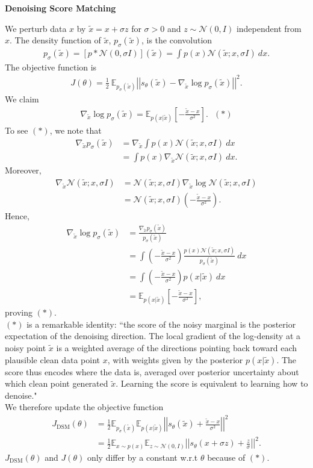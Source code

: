\documentclass[12pt,oneside]{article}
\newcommand{\norm}[1]{\left|\left|#1\right|\right|}
\newcommand{\CN}[0]{\mathcal{N}}
\newcommand{\BE}[0]{\mathbb{E}}
\newcommand{\ali}[1]{\begin{align*}#1\end{align*}}
\theoremstyle{plain}
\theoremstyle{remark}
\begin{document}
{\bf Denoising Score Matching\\}

We perturb data $x$ by $\tilde{x} = x + \sigma z$ for $\sigma > 0$ and $z \sim \CN(0, I)$ independent from $x$. The density function of $\tilde{x}$, $p_\sigma(\tilde{x})$, is the convolution
\ali{p_\sigma(\tilde{x}) = [p * \CN(0, \sigma I)](\tilde{x}) = \int p(x) \CN(\tilde{x}; x, \sigma I) \ dx.}
The objective function is 
\ali{J(\theta) = \frac{1}{2} \ \BE_{p_\sigma(\tilde{x})}  \norm{s_\theta(\tilde{x}) - \nabla_{\tilde{x}} \log p_\sigma(\tilde{x})}^2.}
We claim 
\ali{\nabla_{\tilde{x}} \log p_\sigma(\tilde{x}) = \BE_{p(x | \tilde{x})} \left[ - \frac{\tilde{x} - x}{\sigma^2} \right]. \ \ \ (*)}
To see $(*)$, we note that 
\ali{\nabla_{\tilde{x}} p_\sigma(\tilde{x}) &= \nabla_{\tilde{x}} \int p(x) \CN(\tilde{x}; x, \sigma I) \ dx \\
                                            &= \int p(x) \nabla_{\tilde{x}} \CN(\tilde{x}; x, \sigma I) \ dx.}
Moreover, 
\ali{\nabla_{\tilde{x}} \CN(\tilde{x}; x, \sigma I) &= \CN(\tilde{x}; x, \sigma I) \nabla_{\tilde{x}} \log \CN(\tilde{x}; x, \sigma I) \\
                                                    &= \CN(\tilde{x}; x, \sigma I) \left(- \frac{\tilde{x} - x}{\sigma^2} \right).}
Hence, 
\ali{\nabla_{\tilde{x}} \log p_\sigma(\tilde{x}) &=  \frac{\nabla_{\tilde{x}} p_\sigma(\tilde{x})}{ p_\sigma(\tilde{x})} \\
                                                 &= \int \left(- \frac{\tilde{x} - x}{\sigma^2} \right) \frac{p(x)\CN(\tilde{x}; x, \sigma I)}{p_\sigma(\tilde{x})} \ dx \\
                                                 &= \int \left(- \frac{\tilde{x} - x}{\sigma^2} \right) p(x | \tilde{x}) \ dx \\
                                                 &= \BE_{p(x | \tilde{x})} \left[ - \frac{\tilde{x} - x}{\sigma^2} \right],}
proving $(*)$.\\
$(*)$ is a remarkable identity: ``the score of the noisy marginal is the posterior expectation of the
denoising direction. The local gradient of the log-density at a noisy point $\tilde{x}$ is a weighted
average of the directions pointing back toward each plausible clean data point $x$, with
weights given by the posterior $p(x | \tilde{x})$. The score thus encodes where the data is, averaged
over posterior uncertainty about which clean point generated $\tilde{x}$. Learning the score is equivalent to learning how to denoise."\\
We therefore update the objective function
\ali{J_{\text{DSM}}(\theta) &= \frac{1}{2} \BE_{p_\sigma(\tilde{x})} \BE_{p(x | \tilde{x})} \norm{s_\theta(\tilde{x}) + \frac{\tilde{x} - x}{\sigma^2}}^2 \\
                    &= \frac{1}{2} \BE_{x \sim p(x)} \BE_{z \sim \CN(0, I)} \norm{s_\theta(x + \sigma z) + \frac{z}{\sigma}}^2.}
$J_{\text{DSM}}(\theta)$ and $J(\theta)$ only differ by a constant w.r.t $\theta$ because of $(*)$.\\
\end{document}
